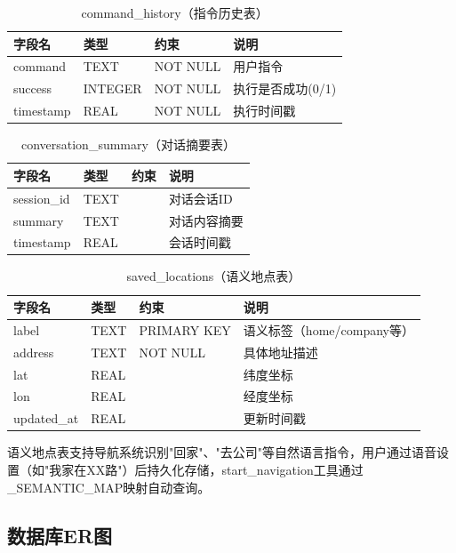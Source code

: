 \documentclass[a4paper]{article}
\begin{document}
\begin{table}[H]
  \centering
  \caption{command\_history（指令历史表）}
  \label{tab:command_history}
  \begin{tabular}{llll}
  \toprule
  字段名 & 类型 & 约束 & 说明 \\
  \midrule
  command & TEXT & NOT NULL & 用户指令 \\
  success & INTEGER & NOT NULL & 执行是否成功(0/1) \\
  timestamp & REAL & NOT NULL & 执行时间戳 \\
  \bottomrule
  \end{tabular}
\end{table}

\begin{table}[H]
  \centering
  \caption{conversation\_summary（对话摘要表）}
  \label{tab:conversation_summary}
  \begin{tabular}{llll}
  \toprule
  字段名 & 类型 & 约束 & 说明 \\
  \midrule
  session\_id & TEXT &  & 对话会话ID \\
  summary & TEXT &  & 对话内容摘要 \\
  timestamp & REAL &  & 会话时间戳 \\
  \bottomrule
  \end{tabular}
\end{table}

\begin{table}[H]
  \centering
  \caption{saved\_locations（语义地点表）}
  \label{tab:saved_locations}
  \begin{tabular}{llll}
  \toprule
  字段名 & 类型 & 约束 & 说明 \\
  \midrule
  label & TEXT & PRIMARY KEY & 语义标签（home/company等）\\
  address & TEXT & NOT NULL & 具体地址描述 \\
  lat & REAL &  & 纬度坐标 \\
  lon & REAL &  & 经度坐标 \\
  updated\_at & REAL &  & 更新时间戳 \\
  \bottomrule
  \end{tabular}
\end{table}

语义地点表支持导航系统识别"回家"、"去公司"等自然语言指令，用户通过语音设置（如"我家在XX路"）后持久化存储，start\_navigation工具通过\_SEMANTIC\_MAP映射自动查询。

\subsection{数据库ER图}
\end{document}

